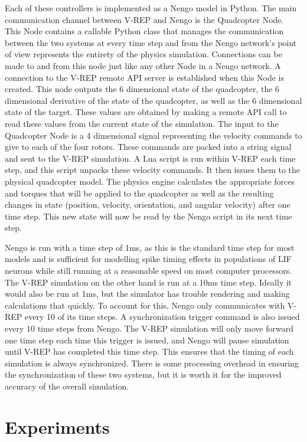 \documentclass[letterpaper,12pt,titlepage,oneside,final]{book}
\begin{document}
Each of these controllers is implemented as a Nengo model in Python. The main communication channel between V-REP and Nengo is the Quadcopter Node. This Node contains a callable Python class that manages the communication between the two systems at every time step and from the Nengo network’s point of view represents the entirety of the physics simulation. Connections can be made to and from this node just like any other Node in a Nengo network. A connection to the V-REP remote API server is established when this Node is created. This node outputs the 6 dimensional state of the quadcopter, the 6 dimensional derivative of the state of the quadcopter, as well as the 6 dimensional state of the target. These values are obtained by making a remote API call to read these values from the current state of the simulation. The input to the Quadcopter Node is a 4 dimensional signal representing the velocity commands to give to each of the four rotors. These commands are packed into a string signal and sent to the V-REP simulation. A Lua script is run within V-REP each time step, and this script unpacks these velocity commands. It then issues them to the physical quadcopter model. The physics engine calculates the appropriate forces and torques that will be applied to the quadcopter as well as the resulting changes in state (position, velocity, orientation, and angular velocity) after one time step. This new state will now be read by the Nengo script in its next time step.

Nengo is run with a time step of 1ms, as this is the standard time step for most models and is sufficient for modelling spike timing effects in populations of LIF neurons while still running at a reasonable speed on most computer processors. The V-REP simulation on the other hand is run at a 10ms time step. Ideally it would also be run at 1ms, but the simulator has trouble rendering and making calculations that quickly. To account for this, Nengo only communicates with V-REP every 10 of its time steps. A synchronization trigger command is also issued every 10 time steps from Nengo. The V-REP simulation will only move forward one time step each time this trigger is issued, and Nengo will pause simulation until V-REP has completed this time step. This ensures that the timing of each simulation is always synchronized. There is some processing overhead in ensuring the synchronization of these two systems, but it is worth it for the improved accuracy of the overall simulation. 

\section{Experiments}
\end{document}
